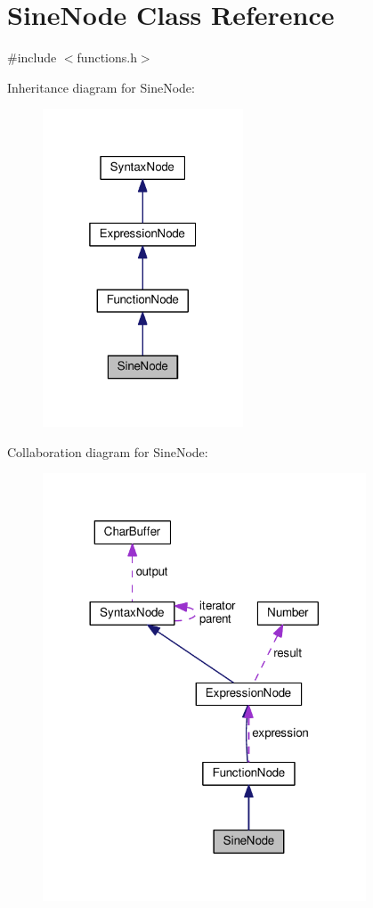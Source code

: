 \hypertarget{classSineNode}{}\section{Sine\+Node Class Reference}
\label{classSineNode}


{\ttfamily \#include $<$functions.\+h$>$}



Inheritance diagram for Sine\+Node\+:
\nopagebreak
\begin{figure}[H]
\begin{center}
\leavevmode
\includegraphics[width=169pt]{d1/df2/classSineNode__inherit__graph}
\end{center}
\end{figure}


Collaboration diagram for Sine\+Node\+:
\nopagebreak
\begin{figure}[H]
\begin{center}
\leavevmode
\includegraphics[width=272pt]{d3/d79/classSineNode__coll__graph}
\end{center}
\end{figure}
